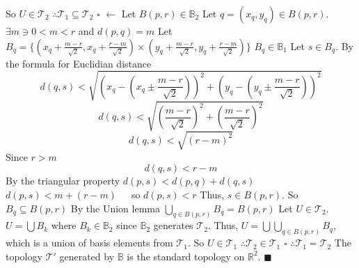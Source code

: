 \documentclass[12pt]{article}
\begin{document}
	So \(U \in \mathcal{T}_2\)
	\newline
	\(\therefore \mathcal{T}_1 \subseteq \mathcal{T}_2\)
	\newline \(\square\) \newline \newline
	\(\leftarrow\) Let \(B(p,r) \in \mathbb{B}_2\) \newline
	Let \(q = (x_q, y_q) \in B(p,r)\). \newline
	\(\exists m \ni 0 < m < r\) and \(d(p,q) = m\) \newline
	Let \(B_q = \{(x_q + \frac{m-r}{\sqrt{2}}, x_q +\frac{r-m}{\sqrt{2}}) \times (y_q + \frac{m-r}{\sqrt{2}}, y_q +\frac{r-m}{\sqrt{2}})\}\) \newline
	\(B_q \in \mathbb{B}_1\)
	\newline
	Let \(s \in B_q\). \newline
	By the formula for Euclidian distance
	\[d(q,s)<\sqrt{\left(x_q-(x_q \pm \frac{m-r}{\sqrt{2}})\right)^2+\left(y_q-(y_q \pm \frac{m-r}{\sqrt{2}})\right)^2}\]
	\[d(q,s)<\sqrt{\left(\frac{m-r}{\sqrt{2}}\right)^2 + \left(\frac{m-r}{\sqrt{2}}\right)^2}\]
	\[d(q,s)<\sqrt{(r-m)^2}\]
	Since \(r>m\)
	\[d(q,s)<r-m\]
	By the triangular property \newline
	\(d(p,s)<d(p,q)+d(q,s)\) \newline
	\(d(p,s)<m+(r-m)\)\ \ \ so \(d(p,s)<r\) \newline
	\newline
	Thus, \(s \in B(p,r)\).
	\newline
	So \(B_q \subseteq B(p,r)\) \newline
	By the Union lemma \(\bigcup_{q \in B(p,r)}B_q=B(p,r)\)
	\newline \newline
	Let \(U \in \mathcal{T}_2\).
	\newline \(U = \bigcup B_k\) where \(B_k \in \mathbb{B}_2\) since \(\mathbb{B}_2\) generates \(\mathcal{T}_2\). \newline
	Thus, \(U = \bigcup \bigcup_{q \in B(p,r)}B_q\), which is a union of basis elements from \(\mathcal{T}_1\). \newline
	So \(U \in \mathcal{T}_1\) \newline
	\(\therefore \mathcal{T}_2 \in \mathcal{T}_1\)
	\newline \(\square\) \newline
	\(\therefore \mathcal{T}_1 = \mathcal{T}_2\) \newline
	The topology \(\mathcal{T}'\) generated by \(\mathbb{B}\) is the standard topology on \(\mathbb{R}^2\).
	\newline \(\blacksquare\) \newline
\end{document}
